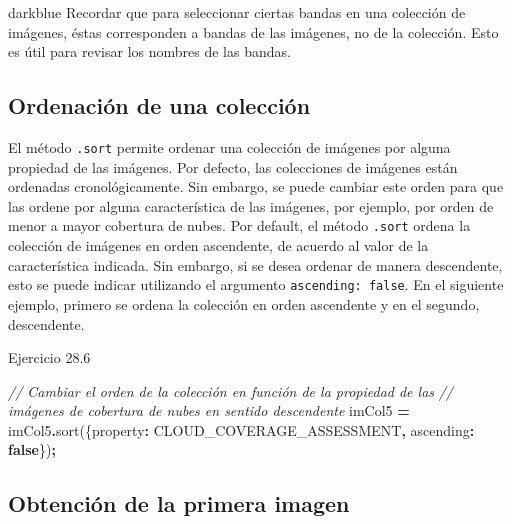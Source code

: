 \documentclass[
  12pt,
  letterpaper,
  twoside]{book}
\newenvironment{Shaded}{\begin{snugshade}}{\end{snugshade}}
\newcommand{\CommentTok}[1]{\textcolor[rgb]{0.56,0.35,0.01}{\textit{#1}}}
\newcommand{\DataTypeTok}[1]{\textcolor[rgb]{0.13,0.29,0.53}{#1}}
\newcommand{\FunctionTok}[1]{\textcolor[rgb]{0.00,0.00,0.00}{#1}}
\newcommand{\KeywordTok}[1]{\textcolor[rgb]{0.13,0.29,0.53}{\textbf{#1}}}
\newcommand{\NormalTok}[1]{#1}
\newcommand{\OperatorTok}[1]{\textcolor[rgb]{0.81,0.36,0.00}{\textbf{#1}}}
\newcommand{\StringTok}[1]{\textcolor[rgb]{0.31,0.60,0.02}{#1}}
\begin{document}
\begin{bluebox2}

\begin{awesomeblock}{5pt}{\faLightbulb}{darkblue}
Recordar que para seleccionar ciertas bandas en una colección de imágenes, éstas corresponden a bandas de las imágenes, no de la colección. Esto es útil para revisar los nombres de las bandas.

\end{awesomeblock}

\end{bluebox2}

\hypertarget{ordenaciuxf3n-de-una-colecciuxf3n}{%
\subsection{Ordenación de una colección}\label{ordenaciuxf3n-de-una-colecciuxf3n}}

El método \texttt{.sort} permite ordenar una colección de imágenes por alguna propiedad de las imágenes. Por defecto, las colecciones de imágenes están ordenadas cronológicamente. Sin embargo, se puede cambiar este orden para que las ordene por alguna característica de las imágenes, por ejemplo, por orden de menor a mayor cobertura de nubes. Por default, el método \texttt{.sort} ordena la colección de imágenes en orden ascendente, de acuerdo al valor de la característica indicada. Sin embargo, si se desea ordenar de manera descendente, esto se puede indicar utilizando el argumento \texttt{ascending:\ false}. En el siguiente ejemplo, primero se ordena la colección en orden ascendente y en el segundo, descendente.

Ejercicio 28.6

\begin{Shaded}
\begin{Highlighting}[]
\CommentTok{// Cambiar el orden de la colección en función de la propiedad de las }
\CommentTok{// imágenes de cobertura de nubes en sentido descendente}
\NormalTok{imCol5 }\OperatorTok{=}\NormalTok{ imCol5}\OperatorTok{.}\FunctionTok{sort}\NormalTok{(\{}\DataTypeTok{property}\OperatorTok{:} \StringTok{\textquotesingle{}CLOUD\_COVERAGE\_ASSESSMENT\textquotesingle{}}\OperatorTok{,} \DataTypeTok{ascending}\OperatorTok{:} \KeywordTok{false}\NormalTok{\})}\OperatorTok{;}
\end{Highlighting}
\end{Shaded}

\hypertarget{obtenciuxf3n-de-la-primera-imagen}{%
\subsection{Obtención de la primera imagen}\label{obtenciuxf3n-de-la-primera-imagen}}
\end{document}

